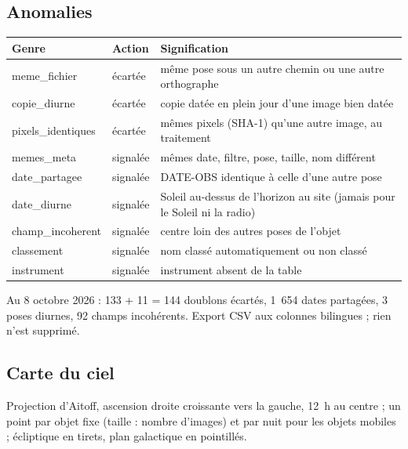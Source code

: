 \subsection{Anomalies}
\begin{center}\small
\begin{tabularx}{\linewidth}{@{}>{\ttfamily}llX@{}}
\toprule
\normalfont\textbf{Genre} & \textbf{Action} & \textbf{Signification}\\
\midrule
meme\_fichier & écartée & même pose sous un autre chemin ou une autre orthographe\\
copie\_diurne & écartée & copie datée en plein jour d'une image bien datée\\
pixels\_identiques & écartée & mêmes pixels (SHA-1) qu'une autre image, au traitement\\
memes\_meta & signalée & mêmes date, filtre, pose, taille, nom différent\\
date\_partagee & signalée & DATE-OBS identique à celle d'une autre pose\\
date\_diurne & signalée & Soleil au-dessus de l'horizon au site (jamais pour le Soleil ni la radio)\\
champ\_incoherent & signalée & centre loin des autres poses de l'objet\\
classement & signalée & nom classé automatiquement ou non classé\\
instrument & signalée & instrument absent de la table\\
\bottomrule
\end{tabularx}
\end{center}
Au 8 octobre 2026 : 133 + 11 = 144 doublons écartés, 1~654 dates partagées, 3 poses diurnes, 92 champs
incohérents. Export CSV aux colonnes bilingues ; rien n'est supprimé.

\subsection{Carte du ciel}
Projection d'Aitoff, ascension droite croissante vers la gauche, 12~h au centre ; un point par objet fixe (taille :
nombre d'images) et par nuit pour les objets mobiles ; écliptique en tirets, plan galactique en pointillés.


